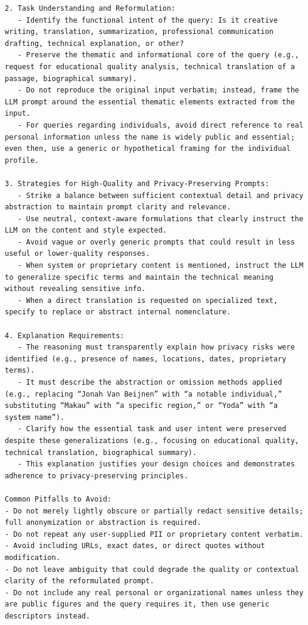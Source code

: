 \begin{instructbox}
\begin{lstlisting}[breakindent=0pt, breaklines=true, breakatwhitespace=true, frame=single, backgroundcolor=\color{blue!10}]
2. Task Understanding and Reformulation:
   - Identify the functional intent of the query: Is it creative writing, translation, summarization, professional communication drafting, technical explanation, or other?
   - Preserve the thematic and informational core of the query (e.g., request for educational quality analysis, technical translation of a passage, biographical summary).
   - Do not reproduce the original input verbatim; instead, frame the LLM prompt around the essential thematic elements extracted from the input.
   - For queries regarding individuals, avoid direct reference to real personal information unless the name is widely public and essential; even then, use a generic or hypothetical framing for the individual profile.

3. Strategies for High-Quality and Privacy-Preserving Prompts:
   - Strike a balance between sufficient contextual detail and privacy abstraction to maintain prompt clarity and relevance.
   - Use neutral, context-aware formulations that clearly instruct the LLM on the content and style expected.
   - Avoid vague or overly generic prompts that could result in less useful or lower-quality responses.
   - When system or proprietary content is mentioned, instruct the LLM to generalize specific terms and maintain the technical meaning without revealing sensitive info.
   - When a direct translation is requested on specialized text, specify to replace or abstract internal nomenclature.

4. Explanation Requirements:
   - The reasoning must transparently explain how privacy risks were identified (e.g., presence of names, locations, dates, proprietary terms).
   - It must describe the abstraction or omission methods applied (e.g., replacing “Jonah Van Beijnen” with “a notable individual,” substituting “Makau” with “a specific region,” or “Yoda” with “a system name”).
   - Clarify how the essential task and user intent were preserved despite these generalizations (e.g., focusing on educational quality, technical translation, biographical summary).
   - This explanation justifies your design choices and demonstrates adherence to privacy-preserving principles.

Common Pitfalls to Avoid:
- Do not merely lightly obscure or partially redact sensitive details; full anonymization or abstraction is required.
- Do not repeat any user-supplied PII or proprietary content verbatim.
- Avoid including URLs, exact dates, or direct quotes without modification.
- Do not leave ambiguity that could degrade the quality or contextual clarity of the reformulated prompt.
- Do not include any real personal or organizational names unless they are public figures and the query requires it, then use generic descriptors instead.


\end{lstlisting}
\end{instructbox}

